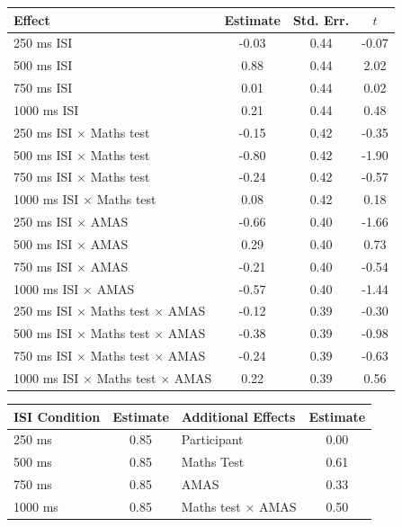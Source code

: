 \documentclass[A4paper,man,floatsintext]{apa6}
\theoremstyle{definition}
\theoremstyle{definition}
\theoremstyle{definition}
\theoremstyle{remark}
\begin{document}
\begin{appendix}
\begin{table}[!p]
\begin{subtable}{\textwidth}
\begin{table}[H]
\begin{tabular}{lccc}
\toprule
Effect & Estimate & Std. Err. & $t$\\
\midrule
250 ms ISI & -0.03 & 0.44 & -0.07\\
500 ms ISI & 0.88 & 0.44 & 2.02\\
750 ms ISI & 0.01 & 0.44 & 0.02\\
1000 ms ISI & 0.21 & 0.44 & 0.48\\
250 ms ISI $\times$ Maths test & -0.15 & 0.42 & -0.35\\
500 ms ISI $\times$ Maths test & -0.80 & 0.42 & -1.90\\
750 ms ISI $\times$ Maths test & -0.24 & 0.42 & -0.57\\
1000 ms ISI $\times$ Maths test & 0.08 & 0.42 & 0.18\\
250 ms ISI $\times$ AMAS & -0.66 & 0.40 & -1.66\\
500 ms ISI $\times$ AMAS & 0.29 & 0.40 & 0.73\\
750 ms ISI $\times$ AMAS & -0.21 & 0.40 & -0.54\\
1000 ms ISI $\times$ AMAS & -0.57 & 0.40 & -1.44\\
250 ms ISI $\times$ Maths test $\times$ AMAS & -0.12 & 0.39 & -0.30\\
500 ms ISI $\times$ Maths test $\times$ AMAS & -0.38 & 0.39 & -0.98\\
750 ms ISI $\times$ Maths test $\times$ AMAS & -0.24 & 0.39 & -0.63\\
1000 ms ISI $\times$ Maths test $\times$ AMAS & 0.22 & 0.39 & 0.56\\
\bottomrule
\end{tabular}\endgroup{}
\end{table}
\end{subtable}
\begin{subtable}{\textwidth}
\caption{Variance Component Estimates. Estimates are presented on the standard deviation scale.}
\centering
\begin{table}[H]\centering\begingroup\fontsize{10}{12}\selectfont

\begin{tabular}{lc|lc}
\toprule
ISI Condition & Estimate & Additional Effects & Estimate\\
\midrule
250 ms & 0.85 & Participant & 0.00\\
500 ms & 0.85 & Maths Test & 0.61\\
750 ms & 0.85 & AMAS & 0.33\\
1000 ms & 0.85 & Maths test $\times$ AMAS & 0.50\\
\bottomrule
\end{tabular}\endgroup{}
\end{table}
\end{subtable}
\end{table}


\end{appendix}
\end{document}
